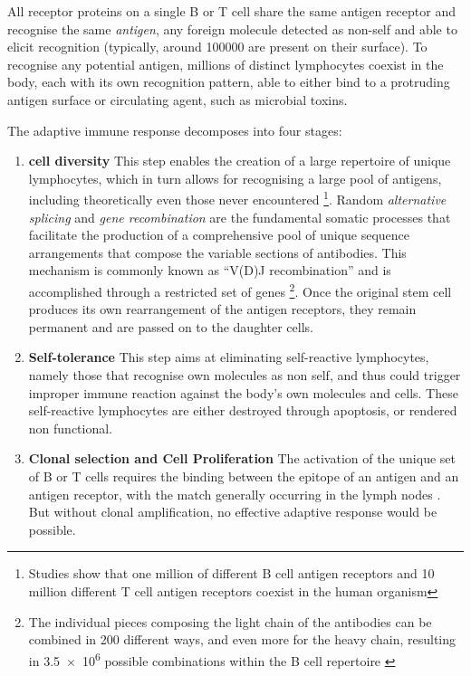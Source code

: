 All receptor proteins on a single B or T cell share the same antigen receptor and recognise the same \emph{antigen}, any foreign molecule detected as non-self and able to elicit recognition (typically, around \num{100000} are present on their surface). To recognise any potential antigen, millions of distinct lymphocytes coexist in the body, each with its own recognition pattern, able to either bind to a protruding antigen surface or circulating agent, such as microbial toxins. 


The adaptive immune response decomposes into four stages:
\begin{enumerate}[label=(\alph*)]
    \item \textbf{cell diversity} This step enables the creation of a large repertoire of unique lymphocytes, which in turn allows for recognising a large pool of antigens, including theoretically even those never encountered \footnote{Studies show that one million of different B cell antigen receptors and 10 million different T cell antigen receptors coexist in the human organism}. Random \emph{alternative splicing} and \emph{gene recombination} are the fundamental somatic processes that facilitate the production of a comprehensive pool of unique sequence arrangements that compose the variable sections of antibodies. This mechanism is commonly known as \enquote{V(D)J recombination} \autocite{bassing_etal02} and is accomplished through a restricted set of genes  \footnote{The individual pieces composing the light chain of the antibodies can be combined in 200 different ways, and even more for the heavy chain, resulting in \num{3.5e6} possible combinations within the B cell repertoire \autocite{guo12}}. Once the original stem cell produces its own rearrangement of the antigen receptors, they remain permanent and are passed on to the daughter cells.
    
    \item \textbf{Self-tolerance} This step aims at eliminating self-reactive lymphocytes, namely those that recognise own molecules as non self, and thus could trigger improper immune reaction against the body's own molecules and cells. These self-reactive lymphocytes are either destroyed through apoptosis, or rendered non functional. 

    \item \textbf{Clonal selection and Cell Proliferation} The activation of the unique set of B or T cells requires the binding between the epitope of an antigen and an antigen receptor, with the match generally occurring in the lymph nodes \autocite[Figure 6, Chapter 43]{campbell_etal20}. But without clonal amplification, no effective adaptive response would be possible. 
    

\end{enumerate}

